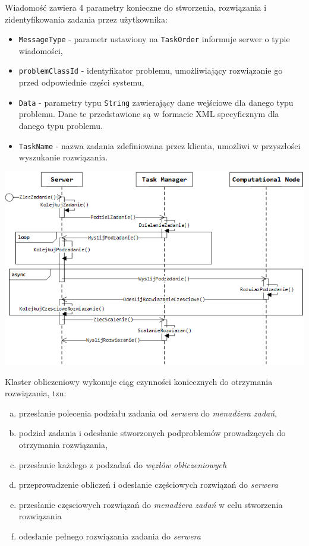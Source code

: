 \documentclass[12pt,a4paper,titlepage]{report}
\begin{document}
    Wiadomość zawiera 4 parametry konieczne do stworzenia, rozwiązania i zidentyfikowania zadania przez użytkownika:
    \begin{itemize}
    	\item \verb+MessageType+ - parametr ustawiony na \verb+TaskOrder+ informuje serwer o typie wiadomości,
    	\item \verb+problemClassId+ - identyfikator problemu, umożliwiający rozwiązanie go przed odpowiednie części systemu,
    	\item \verb+Data+ - parametry typu \verb+String+ zawierający dane wejściowe dla danego typu problemu. Dane te przedstawione są w formacie XML specyficznym dla danego typu problemu.
    	\item \verb+TaskName+ - nazwa zadania zdefiniowana przez klienta, umożliwi w przyszłości wyszukanie rozwiązania.  
    \end{itemize}
	

	\includegraphics[width=\textwidth]{img/communication/computation.png}

	Klaster obliczeniowy wykonuje ciąg czynności koniecznych do otrzymania rozwiązania, tzn:
	\begin{enumerate}[(a)]
		\item przesłanie polecenia podziału zadania od \textit{serwera} do \textit{menadżera zadań},
		\item podział zadania i odesłanie stworzonych podproblemów prowadzących do otrzymania rozwiązania,
		\item przesłanie każdego z podzadań do \textit{węzłów obliczeniowych}
		\item przeprowadzenie obliczeń i odesłanie częściowych rozwiązań do \textit{serwera}
		\item przesłanie częsciowych rozwiązań do \textit{menadżera zadań} w celu stworzenia rozwiązania
		\item odesłanie pełnego rozwiązania zadania do \textit{serwera}
	\end{enumerate}
    
\end{document}
